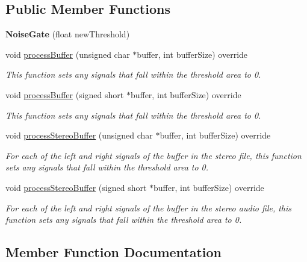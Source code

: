 \subsection*{Public Member Functions}
\begin{DoxyCompactItemize}
\item 
\mbox{\label{classNoiseGate_aecd2507a2de086259c70047c2fdcbb28}} 
{\bfseries Noise\+Gate} (float new\+Threshold)
\item 
void \hyperlink{classNoiseGate_acab8baa73ab66ee5c377631c2c1f3c72}{process\+Buffer} (unsigned char $\ast$buffer, int buffer\+Size) override
\begin{DoxyCompactList}\small\item\em This function sets any signals that fall within the threshold area to 0. \end{DoxyCompactList}\item 
void \hyperlink{classNoiseGate_a7fff3386cd56cb96c60ccec17ec6afd0}{process\+Buffer} (signed short $\ast$buffer, int buffer\+Size) override
\begin{DoxyCompactList}\small\item\em This function sets any signals that fall within the threshold area to 0. \end{DoxyCompactList}\item 
void \hyperlink{classNoiseGate_aeb214c7a4183ee24ef073a3e5c029f94}{process\+Stereo\+Buffer} (unsigned char $\ast$buffer, int buffer\+Size) override
\begin{DoxyCompactList}\small\item\em For each of the left and right signals of the buffer in the stereo file, this function sets any signals that fall within the threshold area to 0. \end{DoxyCompactList}\item 
void \hyperlink{classNoiseGate_a95327c88365a0371c127b9c63bbe56bc}{process\+Stereo\+Buffer} (signed short $\ast$buffer, int buffer\+Size) override
\begin{DoxyCompactList}\small\item\em For each of the left and right signals of the buffer in the stereo audio file, this function sets any signals that fall within the threshold area to 0. \end{DoxyCompactList}\end{DoxyCompactItemize}


\subsection{Member Function Documentation}
\mbox{\label{classNoiseGate_acab8baa73ab66ee5c377631c2c1f3c72}} 
